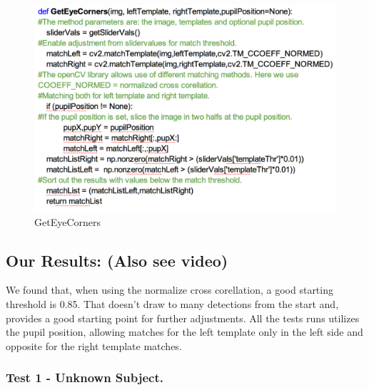 \begin{figure}[htbp]
\centering
\includegraphics{pics/template_matching/getEye.png}
\caption{GetEyeCorners \label{getEyeCorners}}
\end{figure}

\pagebreak

\subsection{Our Results: (Also see video)}

We found that, when using the normalize cross corellation, a good
starting threshold is 0.85. That doesn't draw to many detections from
the start and, provides a good starting point for further adjustments.
All the tests runs utilizes the pupil position, allowing matches for the
left template only in the left side and opposite for the right template
matches.

\subsubsection{Test 1 - Unknown Subject.}


